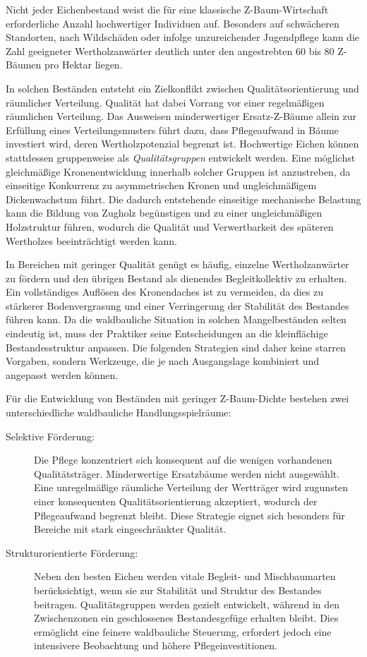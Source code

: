 \documentclass[twocolumn, bibliography=totoc, abstract=true]{scrartcl}
\begin{document}
Nicht jeder Eichenbestand weist die für eine klassische Z-Baum-Wirtschaft erforderliche Anzahl hochwertiger Individuen auf. Besonders auf schwächeren Standorten, nach Wildschäden oder infolge unzureichender Jugendpflege kann die Zahl geeigneter Wertholzanwärter deutlich unter den angestrebten 60 bis 80 Z-Bäumen pro Hektar liegen.

In solchen Beständen entsteht ein Zielkonflikt zwischen Qualitätsorientierung und räumlicher Verteilung. Qualität hat dabei Vorrang vor einer regelmäßigen räumlichen Verteilung. Das Ausweisen minderwertiger Ersatz-Z-Bäume allein zur Erfüllung eines Verteilungsmusters führt dazu, dass Pflegeaufwand in Bäume investiert wird, deren Wertholzpotenzial begrenzt ist. Hochwertige Eichen können stattdessen gruppenweise als \emph{Qualitätsgruppen} entwickelt werden. Eine möglichst gleichmäßige Kronenentwicklung innerhalb solcher Gruppen ist anzustreben, da einseitige Konkurrenz zu asymmetrischen Kronen und ungleichmäßigem Dickenwachstum führt. Die dadurch entstehende einseitige mechanische Belastung kann die Bildung von Zugholz begünstigen und zu einer ungleichmäßigen Holzstruktur führen, wodurch die Qualität und Verwertbarkeit des späteren Wertholzes beeinträchtigt werden kann.

In Bereichen mit geringer Qualität genügt es häufig, einzelne Wertholzanwärter zu fördern und den übrigen Bestand als dienendes Begleitkollektiv zu erhalten. Ein vollständiges Auflösen des Kronendaches ist zu vermeiden, da dies zu stärkerer Bodenvergrasung und einer Verringerung der Stabilität des Bestandes führen kann. Da die waldbauliche Situation in solchen Mangelbeständen selten eindeutig ist, muss der Praktiker seine Entscheidungen an die kleinflächige Bestandesstruktur anpassen. Die folgenden Strategien sind daher keine starren Vorgaben, sondern Werkzeuge, die je nach Ausgangslage kombiniert und angepasst werden können.

Für die Entwicklung von Beständen mit geringer Z-Baum-Dichte bestehen zwei unterschiedliche waldbauliche Handlungsspielräume:

\begin{description}
\item[Selektive Förderung:] Die Pflege konzentriert sich konsequent auf die wenigen vorhandenen Qualitätsträger. Minderwertige Ersatzbäume werden nicht ausgewählt. Eine unregelmäßige räumliche Verteilung der Wertträger wird zugunsten einer konsequenten Qualitätsorientierung akzeptiert, wodurch der Pflegeaufwand begrenzt bleibt. Diese Strategie eignet sich besonders für Bereiche mit stark eingeschränkter Qualität.
\item[Strukturorientierte Förderung:] Neben den besten Eichen werden vitale Begleit- und Mischbaumarten berücksichtigt, wenn sie zur Stabilität und Struktur des Bestandes beitragen. Qualitätsgruppen werden gezielt entwickelt, während in den Zwischenzonen ein geschlossenes Bestandesgefüge erhalten bleibt. Dies ermöglicht eine feinere waldbauliche Steuerung, erfordert jedoch eine intensivere Beobachtung und höhere Pflegeinvestitionen.
\end{description}
\end{document}
